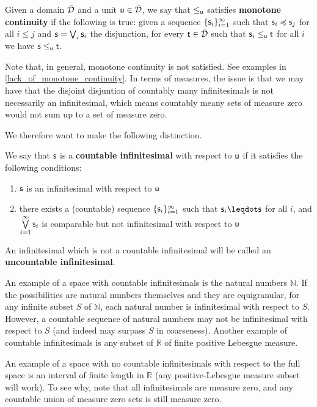 \documentclass[10pt, onecolumn, longbibliography, nofootinbib]{revtex4-2}
\begin{document}
\begin{defn}\label{monotone_continuity}
	Given a domain $\tdomain$ and a unit $\stmt[u] \in\tdomain$, we say that $\lequ$ satisfies \textbf{monotone continuity} if the following is true: given a sequence $\{\stmt_i\}_{i=1}^{\infty}$ such that $\stmt_i \narrower \stmt_j$ for all $ i \leq j$ and $\stmt = \bigOR_i\stmt_i$ the disjunction, for every $\stmt[t] \in \tdomain$ such that $\stmt_i\leq_{\stmt[u]} \stmt[t]$ for all $i$ we have $\stmt\leq_{\stmt[u]} \stmt[t]$.
\end{defn}

Note that, in general, monotone continuity is not satisfied. See examples in \ref{lack_of_monotone_continuity}. In terms of measures, the issue is that we may have that the disjoint disjuntion of countably many infinitesimals is not necessarily an infinitesimal, which means countably meany sets of measure zero would not sum up to a set of measure zero.

We therefore want to make the following distinction.

\begin{defn}
We say that $\stmt$ is a \textbf{countable infinitesimal} with respect to $\stmt[u]$ if it satisfies the following conditions:
\begin{enumerate}
    \item $\stmt$ is an infinitesimal with respect to $\stmt[u]$
    \item there exists a (countable) sequence $\{\stmt_i\}_{i=1}^{\infty}$ such that $\stmt_i\finer\stmt$ for all $i$, and $\bigOR\limits_{i=1}^{\infty}\stmt_i$ is comparable but not infinitesimal with respect to $\stmt[u]$
\end{enumerate}
An infinitesimal which is not a countable infinitesimal will be called an \textbf{uncountable infinitesimal}. 
\end{defn}


An example of a space with countable infinitesimals is the natural numbers $\mathbb{N}$. If the possibilities are natural numbers themselves and they are equigranular, for any infinite subset $S$ of $\mathbb{N}$, each natural number is infinitesimal with respect to $S$. However, a countable sequence of natural numbers may not be infinitesimal with respect to $S$ (and indeed may surpass $S$ in coarseness). Another example of countable infinitesimals is any subset of $\mathbb{R}$ of finite positive Lebesgue measure. 

An example of a space with no countable infinitesimals with respect to the full space is an interval of finite length in $\mathbb{R}$ (any positive-Lebesgue measure subset will work). To see why, note that all infinitesimals are measure zero, and any countable union of measure zero sets is still measure zero. 
\end{document}
